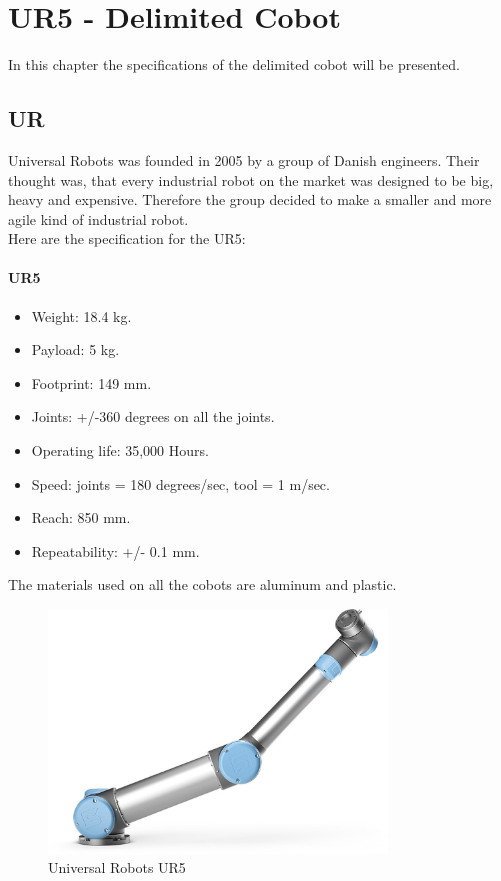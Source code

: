 \chapter{UR5 - Delimited Cobot}

In this chapter the specifications of the delimited cobot will be presented.

\section{UR}

Universal Robots was founded in 2005 by a group of Danish engineers. Their thought was, that every industrial robot on the market was designed to be big, heavy and expensive. Therefore the group decided to make a smaller and more agile kind of industrial robot.\cite{Urhist}\\
Here are the specification for the UR5:\\ 

\subsubsection{UR5}

\begin{itemize}
    \item Weight: 18.4 kg.
    \item Payload: 5 kg.
    \item Footprint: 149 mm.
    \item Joints: +/-360 degrees on all the joints.
    \item Operating life: 35,000 Hours.
    \item Speed: joints = 180 degrees/sec, tool = 1 m/sec.
    \item Reach: 850 mm.
    \item Repeatability: +/- 0.1 mm.
\end{itemize}

The materials used on all the cobots are aluminum and plastic\cite{Ur5_about}\cite{UR5_tech}.\\

\begin{figure}
    \centering
    \includegraphics[width=9cm]{UR/UR5pic.jpg}
    \caption{Universal Robots UR5 \cite{UR5billede}}
    \label{fig:UR5}
\end{figure}

